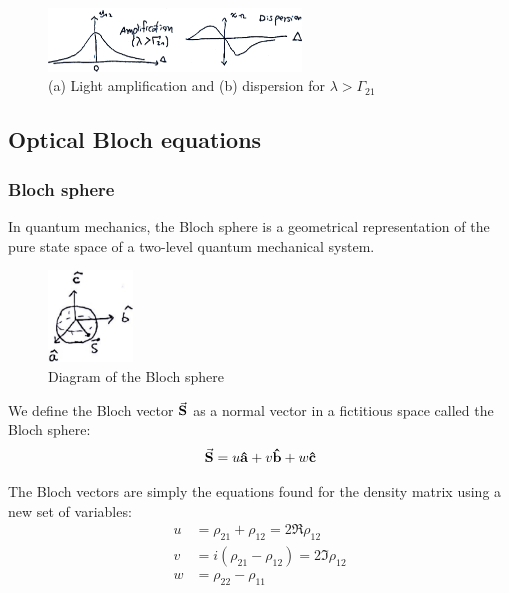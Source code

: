 \begin{figure}[H]
	\centering
	\includegraphics[width=0.6\textwidth]{./images/3-amp-disp}
	\caption{(a) Light amplification and (b) dispersion for $\lambda > \Gamma_{21}$}
	\label{fig:amp-disp}
\end{figure}

\subsection{Optical Bloch equations}
\subsubsection*{Bloch sphere}
In quantum mechanics, the Bloch sphere is a geometrical representation of the pure state space of a two-level quantum mechanical system.
\begin{figure}[H]
	\centering
	\includegraphics[width=0.2\textwidth]{./images/3-bloch-sphere}
	\caption{Diagram of the Bloch sphere}
	\label{fig:bloch-sphere}
\end{figure}

\begin{defi}
	We define the Bloch vector $\va{S}$ as a normal vector in a fictitious space called the Bloch sphere:
	\begin{align}
		\va{S} = u \vu{a} + v \vu{b} + w \vu{c}
	\end{align}
\end{defi}


The Bloch vectors are simply the equations found for the density matrix using a new set of variables:
\begin{subequations}
\begin{align}
	u &= \rho_{21} + \rho_{12} = 2 \Re{\rho_{12}} \\
	v &= i (\rho_{21} - \rho_{12}) = 2 \Im{\rho_{12}} \\
	w &= \rho_{22} - \rho_{11}
\end{align}
\end{subequations}

